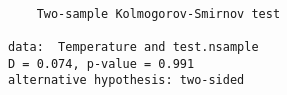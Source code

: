 \begin{verbatim} 

	Two-sample Kolmogorov-Smirnov test

data:  Temperature and test.nsample
D = 0.074, p-value = 0.991
alternative hypothesis: two-sided

\end{verbatim}
